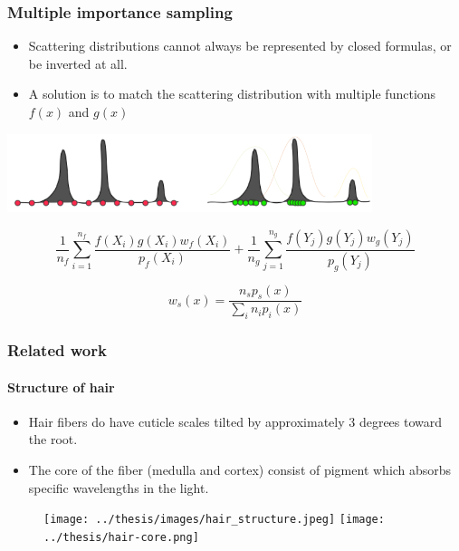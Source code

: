 \documentclass{beamer}
\begin{document}
    
  \begin{frame}
    \frametitle{Multiple importance sampling}
    
    \begin{itemize}
    \item Scattering distributions cannot always be represented by closed formulas, or be inverted at all.
    
    \item A solution is to match the scattering distribution with multiple functions $f(x)$ and $g(x)$
    \end{itemize}
    
        \includegraphics[width=0.8\textwidth,center]{importance_sampling_px.png}
    
    \begin{equation}
\frac{1}{n_f} \sum_{i=1}^{n_f} \frac{f(X_i)g(X_i) w_f(X_i)}{p_f(X_i)} + 
\frac{1}{n_g} \sum_{j=1}^{n_g} \frac{f(Y_j)g(Y_j) w_g(Y_j)}{p_g(Y_j)} 
\end{equation}

\begin{equation}
w_s(x) = \frac{n_sp_s(x)}{\sum_i n_i p_i(x)}
\end{equation}

    
  \end{frame}

  
  \begin{frame}
    \frametitle{Related work}
	\framesubtitle{Structure of hair}
	
	\begin{itemize}
	\item Hair fibers do have cuticle scales tilted by approximately 3 degrees toward the root.
	\item The core of the fiber (medulla and cortex) consist of pigment which absorbs specific wavelengths in the light.
	\end{itemize}
	
	\begin{figure}
	\texttt{[image: ../thesis/images/hair\_structure.jpeg]}
	\texttt{[image: ../thesis/hair-core.png]}
	\end{figure}
  \end{frame}
  
\end{document}
